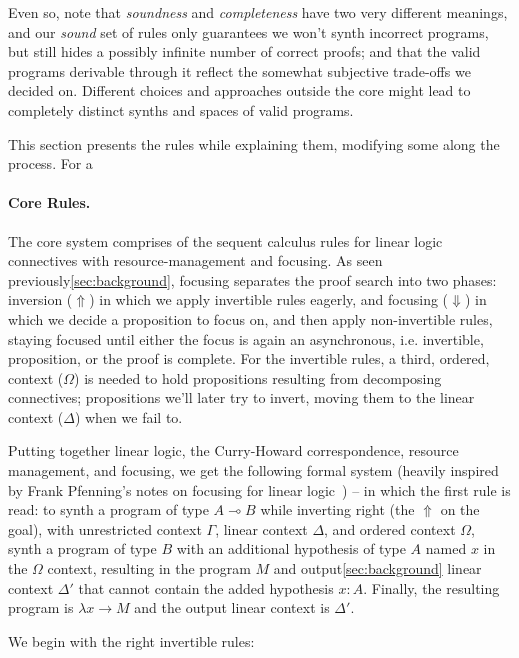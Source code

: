 \documentclass{llncs}
\newcommand{\lolli}{\multimap}
\newcommand{\mypara}[1]{\paragraph{\textbf{#1}.}}
\begin{document}
Even so, note that \emph{soundness} and \emph{completeness} have two very
different meanings, and our \emph{sound} set of rules only guarantees we won't
synth incorrect programs, but still hides a possibly infinite number of correct
proofs; and that the valid programs derivable through it reflect the somewhat
subjective trade-offs we decided on. Different choices and approaches outside
the core might lead to completely distinct synths and spaces of valid programs.

This section presents the rules while explaining them, modifying some along the
process. For a 


\mypara{Core Rules} The core system comprises of the sequent calculus rules for
linear logic connectives with resource-management and focusing. As seen
previously\ref{sec:background}, focusing separates the proof search into two
phases: inversion ($\Uparrow$) in which we apply invertible rules eagerly, and
focusing ($\Downarrow$) in which we decide a proposition to focus on, and then
apply non-invertible rules, staying focused until either the focus is again an
asynchronous, i.e. invertible, proposition, or the proof is complete.  For the
invertible rules, a third, ordered, context ($\Omega$) is needed to hold
propositions resulting from decomposing connectives; propositions we'll later try to
invert, moving them to the linear context ($\Delta$) when we fail to.

Putting together linear logic, the Curry-Howard correspondence, resource
management, and focusing, we get the following formal system (heavily inspired
by Frank Pfenning's notes on focusing for linear logic~\cite{FPnotes...}) -- in which the
first rule is read: to synth a program of type $A \lolli B$ while inverting
right (the $\Uparrow$ on the goal), with unrestricted context $\Gamma$, linear
context $\Delta$, and ordered context $\Omega$, synth a program of type $B$ with
an additional hypothesis of type $A$ named $x$ in the $\Omega$ context,
resulting in the program $M$ and output\ref{sec:background} linear
context $\Delta'$ that cannot contain the added hypothesis $x{:}A$. Finally, the
resulting program is $\lambda x \rightarrow M$ and the output linear context is
$\Delta'$.

We begin with the right invertible rules:
\end{document}
